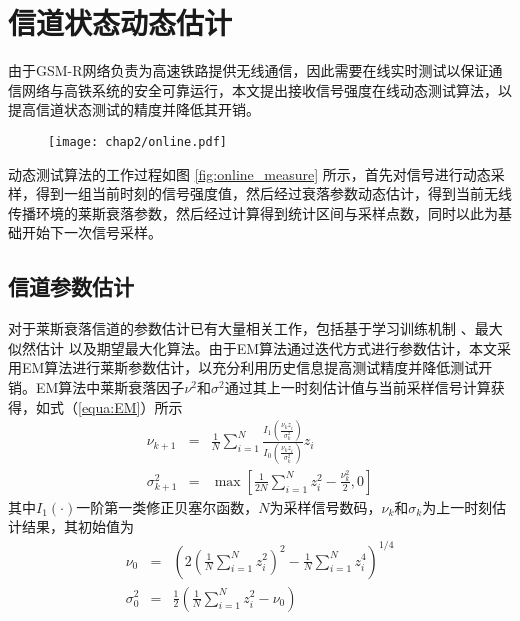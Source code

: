 \section{信道状态动态估计}
\label{sec:dynamic}

由于GSM-R网络负责为高速铁路提供无线通信，因此需要在线实时测试以保证通信网络与高铁系统的安全可靠运行，本文提出接收信号强度在线动态测试算法，以提高信道状态测试的精度并降低其开销。

\begin{figure}[!htp]
\centering
\texttt{[image: chap2/online.pdf]}
\end{figure}

动态测试算法的工作过程如图 \ref{fig:online_measure} 所示，首先对信号进行动态采样，得到一组当前时刻的信号强度值，然后经过衰落参数动态估计，得到当前无线传播环境的莱斯衰落参数，然后经过计算得到统计区间与采样点数，同时以此为基础开始下一次信号采样。

\subsection{信道参数估计}
\label{sec:estimation}

对于莱斯衰落信道的参数估计已有大量相关工作，包括基于学习训练机制 \cite{bjornson2010framework}、最大似然估计 \cite{sijbers1998maximum} 以及期望最大化算法\cite{marzetta1995algorithm}。由于EM算法通过迭代方式进行参数估计，本文采用EM算法进行莱斯参数估计，以充分利用历史信息提高测试精度并降低测试开销。EM算法中莱斯衰落因子$\nu^2$和$\sigma^2$通过其上一时刻估计值与当前采样信号计算获得，如式（\ref{equa:EM}）所示
\begin{subequations}
  \begin{eqnarray}
    \nu_{k+1}&=&\frac{1}{N}\sum_{i=1}^{N}\frac{I_{1}\left(\frac{\nu_{k}z_{i}}{\sigma_k^2}\right)}{I_{0}\left(\frac{\nu_{k}z_{i}}{\sigma_k^2}\right)}z_i \\
    \sigma_{k+1}^2&=&\max{\left[\frac{1}{2N}\sum_{i=1}^N z_i^2 -\frac{\nu_k^2}{2},0\right]}
  \end{eqnarray}
\label{equa:EM}
\end{subequations}
其中$I_1(\cdot)$一阶第一类修正贝塞尔函数，$N$为采样信号数码，$\nu_k$和$\sigma_k$为上一时刻估计结果，其初始值为
\begin{subequations}
  \begin{eqnarray}
    \nu_{0}&=& \left(2\left(\frac{1}{N}\sum_{i=1}^N z_i^2\right)^2-\frac{1}{N}\sum_{i=1}^N z_i^4\right)^{1/4} \\
    \sigma_{0}^2&=&\frac{1}{2}\left(\frac{1}{N}\sum_{i=1}^N z_i^2 - \nu_{0}\right)
  \end{eqnarray}
\label{equa:EM0}
\end{subequations}

